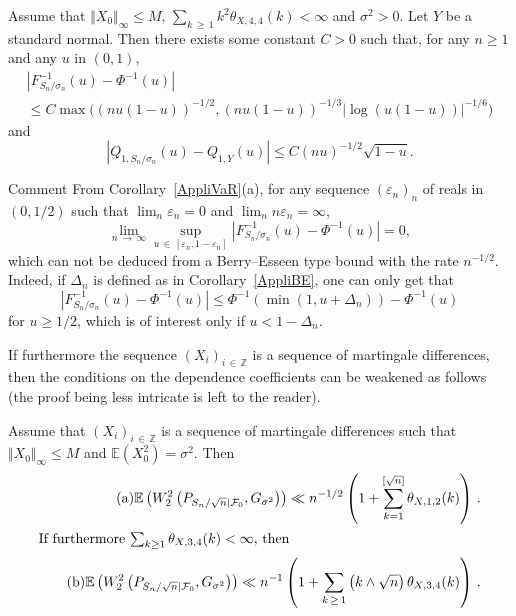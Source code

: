 \documentclass[AHL,Unicode,longabstracts,published]{cedram}
\newcommand{\bbE}{\mathbb{E}}
\newcommand{\bbZ}{\mathbb{Z}}
\newcommand{\clF}{\mathcal{F}}
\begin{document}
\begin{coro}\label{AppliVaR}
Assume that $\Vert X_0 \Vert_{\infty} \leq M$, $\sum_{k\,\geq\,1} k^2
\theta_{X,4,4} (k) < \infty$ and $\sigma^2 >0$. Let $Y$ be a standard normal. Then there exists some constant $C>0$ such that, for any $n\geq 1$ and any $u$ in $(0,1)$,
\begin{multline}\label{coro2.5.a}
\tag{$\rm a$} \left| F_{S_n/\sigma_n}^{-1} (u) - \Phi^{-1} (u) \right| \\ \leq C \max \bigl((nu(1-u))^{-1/2}, (nu(1-u))^{-1/3} |\log (u(1-u)) |^{-1/6} \bigr)
\end{multline}
and
\begin{equation}\label{coro2.5.b}
\tag{$\rm b$}\left| Q_{1, S_n/\sigma_n} (u) - Q_{1,Y} (u)\right| \leq C (nu)^{-1/2} \sqrt{1-u}.
\end{equation}
\end{coro}

\begin{enonce}{Comment}
From Corollary~\ref{AppliVaR}(a), for any sequence $(\varepsilon_n)_n$ of reals in $(0,1/2)$
such that $\lim_n \varepsilon_n= 0$ and $\lim_n n\varepsilon_n = \infty$,
\[
\lim_{n\,\rightarrow\,\infty}
\sup_{u\,\in\,\left[\varepsilon_n,1-\varepsilon_n\right]} \left| F_{S_n/\sigma_n}^{-1} (u) - \Phi^{-1} (u) \right| = 0,
\]
which can not be deduced from a Berry--Esseen type bound with the rate $n^{-1/2}$. Indeed,
if $\Delta_n$ is defined as in Corollary~\ref{AppliBE}, one can only get that
\[
\left| F_{S_n/\sigma_n}^{-1} (u) - \Phi^{-1} (u)\right| \leq \Phi^{-1} (\min (1, u + \Delta_n)) - \Phi^{-1} (u)
\]
for $u\geq 1/2$, which is of interest only if $u < 1 - \Delta_n$.
\end{enonce}

If furthermore the sequence $(X_i)_{i \,\in\,\bbZ}$ is a sequence of martingale differences, then the conditions on the dependence coefficients can be weakened as follows (the proof being less intricate is left to the reader).

\begin{theo} \label{thW2M}
Assume that $(X_i)_{i\,\in\,\bbZ}$ is a sequence of martingale differences such that $\Vert X_0 \Vert_{\infty} \leq M$ and $\bbE (X_0^2) = \sigma^2$. Then
\begin{align}
\tag{$\rm a$}\bbE \left(W_2^2 \left(P_{S_n / {\sqrt n} |\clF_0 }, G_{\sigma^2}\right) \right) \ll n^{-1/2}
\left(1 + \sum_{k=1}^ {[\sqrt n]} \theta_{X,1,2} (k) \right) \,. \label{theo2.7.a}
\\
\intertext{If furthermore $ \sum_{k\geq 1} \theta_{X,3,4} (k) < \infty$, then}
\tag{$\rm b$}\bbE \left(W_2^2 \left(P_{S_n / {\sqrt n} |\clF_0 }, G_{\sigma^2}\right) \right) \ll n^{-1} \left(1 + \sum_{k\,\geq\,1} \left(k \wedge \sqrt{n}\right) \theta_{X,3,4} (k) \right)\,. \label{theo2.7.b}
\end{align}
\end{theo}
\end{document}
